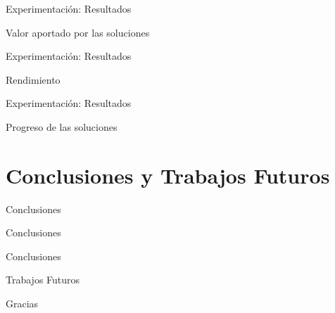 \documentclass{beamer}
\begin{document}
\begin{frame}{Experimentación: Resultados}
    \begin{exampleblock}{Valor aportado por las soluciones}

    \end{exampleblock}
\end{frame}

\begin{frame}{Experimentación: Resultados}
    \begin{exampleblock}{Rendimiento}

    \end{exampleblock}
\end{frame}

\begin{frame}{Experimentación: Resultados}
    \begin{exampleblock}{Progreso de las soluciones}

    \end{exampleblock}
\end{frame}

\section[Conclusiones]{Conclusiones y Trabajos Futuros}

\begin{frame}{Conclusiones}
    \begin{exampleblock}{Conclusiones}

    \end{exampleblock}
\end{frame}

\begin{frame}{Conclusiones}
    \begin{exampleblock}{Trabajos Futuros}

    \end{exampleblock}
\end{frame}

\begin{frame}
    \begin{center}
        {\Huge Gracias}
    \end{center}
\end{frame}
\end{document}
